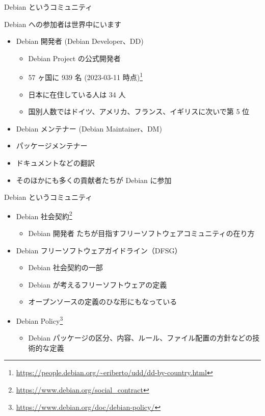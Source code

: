 \begin{frame}{Debian というコミュニティ}

Debian への参加者は世界中にいます

\begin{itemize}
\item Debian 開発者 (Debian Developer、DD)
  \begin{itemize}
  \item Debian Project の公式開発者
  \item 57 ヶ国に 939 名 (2023-03-11 時点)\footnote{\url{https://people.debian.org/~eriberto/udd/dd-by-country.html}}
  \item 日本に在住している人は 34 人
  \item 国別人数ではドイツ、アメリカ、フランス、イギリスに次いで第 5 位
  \end{itemize}
\item Debian メンテナー (Debian Maintainer、DM)
\item パッケージメンテナー
\item ドキュメントなどの翻訳
\item そのほかにも多くの貢献者たちが Debian に参加
\end{itemize}
  
\end{frame}


\begin{frame}{Debian というコミュニティ}

\begin{itemize}
\item Debian 社会契約\footnote{\url{https://www.debian.org/social_contract}}
  \begin{itemize}
  \item Debian 開発者 たちが目指すフリーソフトウェアコミュニティの在り方
  \end{itemize}
\item Debian フリーソフトウェアガイドライン（DFSG）
  \begin{itemize}
  \item Debian 社会契約の一部
  \item Debian が考えるフリーソフトウェアの定義
  \item オープンソースの定義のひな形にもなっている
  \end{itemize}
\item Debian Policy\footnote{\url{https://www.debian.org/doc/debian-policy/}}
  \begin{itemize}
  \item Debian パッケージの区分、内容、ルール、ファイル配置の方針などの技術的な定義
  \end{itemize}
\end{itemize}

\end{frame}


